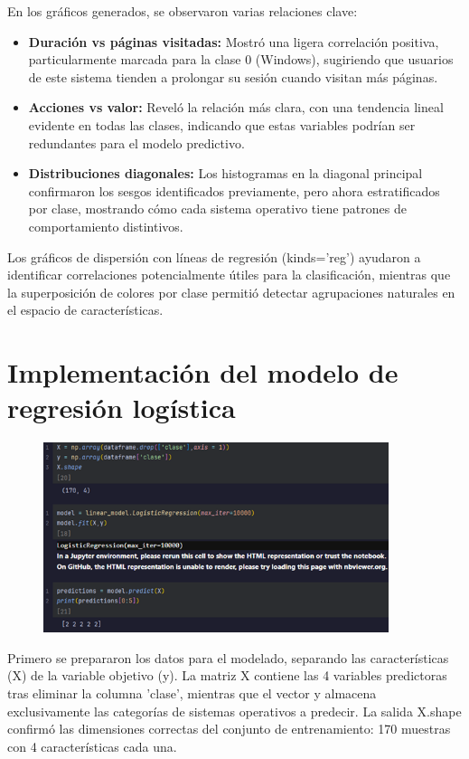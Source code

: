\documentclass{article}
\begin{document}
En los gráficos generados, se observaron varias relaciones clave:

\begin{itemize}
    \item \textbf{Duración vs páginas visitadas:} Mostró una ligera correlación positiva, particularmente marcada para la clase 0 (Windows), sugiriendo que usuarios de este sistema tienden a prolongar su sesión cuando visitan más páginas.
    \item \textbf{Acciones vs valor:} Reveló la relación más clara, con una tendencia lineal evidente en todas las clases, indicando que estas variables podrían ser redundantes para el modelo predictivo.
    \item \textbf{Distribuciones diagonales:} Los histogramas en la diagonal principal confirmaron los sesgos identificados previamente, pero ahora estratificados por clase, mostrando cómo cada sistema operativo tiene patrones de comportamiento distintivos.
\end{itemize}

Los gráficos de dispersión con líneas de regresión (kinds='reg') ayudaron a identificar correlaciones potencialmente útiles para la clasificación, mientras que la superposición de colores por clase permitió detectar agrupaciones naturales en el espacio de características.

\section*{Implementación del modelo de regresión logística}

\begin{figure}[H]
\centering
\includegraphics[width=0.9\textwidth]{Actividad-11/Imagen7.png}
\end{figure}

Primero se prepararon los datos para el modelado, separando las características (X) de la variable objetivo (y). La matriz X contiene las 4 variables predictoras tras eliminar la columna 'clase', mientras que el vector y almacena exclusivamente las categorías de sistemas operativos a predecir. La salida X.shape confirmó las dimensiones correctas del conjunto de entrenamiento: 170 muestras con 4 características cada una.
\end{document}
